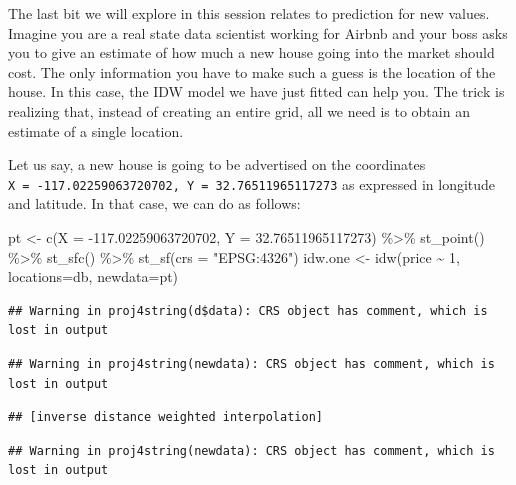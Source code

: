 \documentclass[
]{book}
\newenvironment{Shaded}{\begin{snugshade}}{\end{snugshade}}
\newcommand{\AttributeTok}[1]{\textcolor[rgb]{0.77,0.63,0.00}{#1}}
\newcommand{\DecValTok}[1]{\textcolor[rgb]{0.00,0.00,0.81}{#1}}
\newcommand{\FloatTok}[1]{\textcolor[rgb]{0.00,0.00,0.81}{#1}}
\newcommand{\FunctionTok}[1]{\textcolor[rgb]{0.00,0.00,0.00}{#1}}
\newcommand{\NormalTok}[1]{#1}
\newcommand{\OtherTok}[1]{\textcolor[rgb]{0.56,0.35,0.01}{#1}}
\newcommand{\SpecialCharTok}[1]{\textcolor[rgb]{0.00,0.00,0.00}{#1}}
\newcommand{\StringTok}[1]{\textcolor[rgb]{0.31,0.60,0.02}{#1}}
\begin{document}
The last bit we will explore in this session relates to prediction for new values. Imagine you are a real state data scientist working for Airbnb and your boss asks you to give an estimate of how much a new house going into the market should cost. The only information you have to make such a guess is the location of the house. In this case, the IDW model we have just fitted can help you. The trick is realizing that, instead of creating an entire grid, all we need is to obtain an estimate of a single location.

Let us say, a new house is going to be advertised on the coordinates \texttt{X\ =\ -117.02259063720702,\ Y\ =\ 32.76511965117273} as expressed in longitude and latitude. In that case, we can do as follows:

\begin{Shaded}
\begin{Highlighting}[]
\NormalTok{pt }\OtherTok{\textless{}{-}} \FunctionTok{c}\NormalTok{(}\AttributeTok{X =} \SpecialCharTok{{-}}\FloatTok{117.02259063720702}\NormalTok{, }\AttributeTok{Y =} \FloatTok{32.76511965117273}\NormalTok{) }\SpecialCharTok{\%\textgreater{}\%}
  \FunctionTok{st\_point}\NormalTok{() }\SpecialCharTok{\%\textgreater{}\%}
  \FunctionTok{st\_sfc}\NormalTok{() }\SpecialCharTok{\%\textgreater{}\%}
  \FunctionTok{st\_sf}\NormalTok{(}\AttributeTok{crs =} \StringTok{"EPSG:4326"}\NormalTok{)}
\NormalTok{idw.one }\OtherTok{\textless{}{-}} \FunctionTok{idw}\NormalTok{(price }\SpecialCharTok{\textasciitilde{}} \DecValTok{1}\NormalTok{, }\AttributeTok{locations=}\NormalTok{db, }\AttributeTok{newdata=}\NormalTok{pt)}
\end{Highlighting}
\end{Shaded}

\begin{verbatim}
## Warning in proj4string(d$data): CRS object has comment, which is lost in output
\end{verbatim}

\begin{verbatim}
## Warning in proj4string(newdata): CRS object has comment, which is lost in output
\end{verbatim}

\begin{verbatim}
## [inverse distance weighted interpolation]
\end{verbatim}

\begin{verbatim}
## Warning in proj4string(newdata): CRS object has comment, which is lost in output
\end{verbatim}
\end{document}
